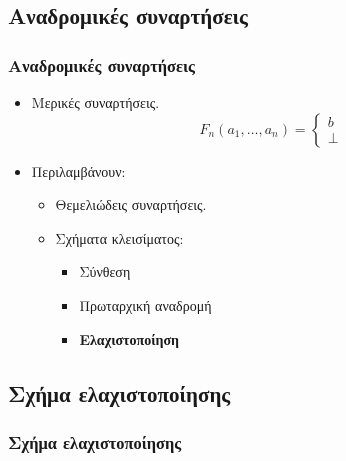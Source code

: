 \documentclass{beamer}
\begin{document}
\subsection{Αναδρομικές συναρτήσεις}

\begin{frame}
  \frametitle{Αναδρομικές συναρτήσεις}
  \begin{itemize}
  \item Μερικές συναρτήσεις.
    $$F_n(a_1,\ldots,a_n)=
    \left\{
    \begin{array}{l}
      b\\
      \bot
    \end{array}
    \right.
    $$
  \item Περιλαμβάνουν:
    \begin{itemize}
    \item Θεμελιώδεις συναρτήσεις.
    \item Σχήματα κλεισίματος:
      \begin{itemize}
      \item Σύνθεση
      \item Πρωταρχική αναδρομή
      \item \textbf{Ελαχιστοποίηση}
      \end{itemize}
    \end{itemize}
  \end{itemize}
\end{frame}

\subsection{Σχήμα ελαχιστοποίησης}

\begin{frame}
  \frametitle{Σχήμα ελαχιστοποίησης}
\end{frame}
\end{document}
